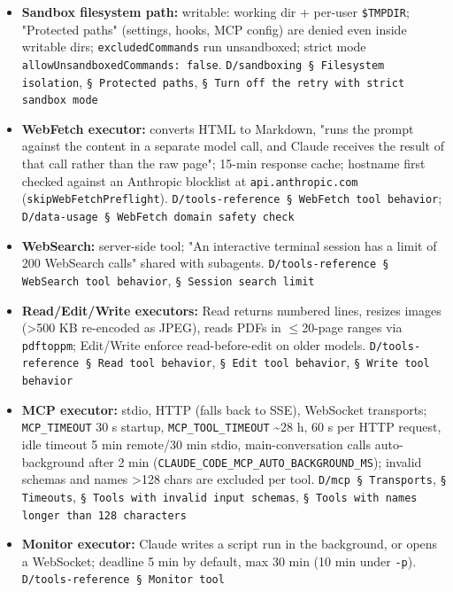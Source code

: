 \begin{itemize}
\item \textbf{Sandbox filesystem path:} writable: working dir + per-user \texttt{\$TMPDIR}; "Protected paths" (settings, hooks, MCP config) are denied even inside writable dirs; \texttt{excludedCommands} run unsandboxed; strict mode \texttt{allowUnsandboxedCommands:\allowbreak{} false}. \texttt{D/\allowbreak{}sandboxing § Filesystem isolation}, \texttt{§ Protected paths}, \texttt{§ Turn off the retry with strict sandbox mode}
\item \textbf{WebFetch executor:} converts HTML to Markdown, "runs the prompt against the content in a separate model call, and Claude receives the result of that call rather than the raw page"; 15-min response cache; hostname first checked against an Anthropic blocklist at \texttt{api.\allowbreak{}anthropic.\allowbreak{}com} (\texttt{skipWebFetchPreflight}). \texttt{D/\allowbreak{}tools-\allowbreak{}reference § WebFetch tool behavior}; \texttt{D/\allowbreak{}data-\allowbreak{}usage § WebFetch domain safety check}
\item \textbf{WebSearch:} server-side tool; "An interactive terminal session has a limit of 200 WebSearch calls" shared with subagents. \texttt{D/\allowbreak{}tools-\allowbreak{}reference § WebSearch tool behavior}, \texttt{§ Session search limit}
\item \textbf{Read/Edit/Write executors:} Read returns numbered lines, resizes images (>500 KB re-encoded as JPEG), reads PDFs in $\leq$20-page ranges via \texttt{pdftoppm}; Edit/Write enforce read-before-edit on older models. \texttt{D/\allowbreak{}tools-\allowbreak{}reference § Read tool behavior}, \texttt{§ Edit tool behavior}, \texttt{§ Write tool behavior}
\item \textbf{MCP executor:} stdio, HTTP (falls back to SSE), WebSocket transports; \texttt{MCP\_\allowbreak{}TIMEOUT} 30 s startup, \texttt{MCP\_\allowbreak{}TOOL\_\allowbreak{}TIMEOUT} \textasciitilde{}28 h, 60 s per HTTP request, idle timeout 5 min remote/30 min stdio, main-conversation calls auto-background after 2 min (\texttt{CLAUDE\_\allowbreak{}CODE\_\allowbreak{}MCP\_\allowbreak{}AUTO\_\allowbreak{}BACKGROUND\_\allowbreak{}MS}); invalid schemas and names >128 chars are excluded per tool. \texttt{D/\allowbreak{}mcp § Transports}, \texttt{§ Timeouts}, \texttt{§ Tools with invalid input schemas}, \texttt{§ Tools with names longer than 128 characters}
\item \textbf{Monitor executor:} Claude writes a script run in the background, or opens a WebSocket; deadline 5 min by default, max 30 min (10 min under \texttt{-\allowbreak{}p}). \texttt{D/\allowbreak{}tools-\allowbreak{}reference § Monitor tool}

\end{itemize}
